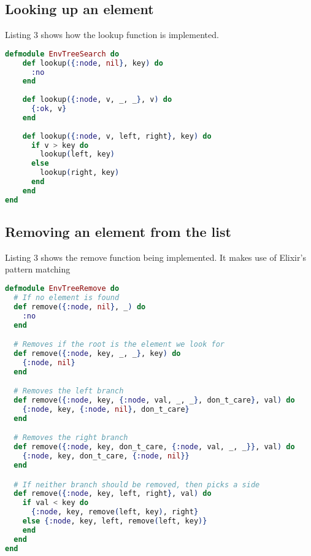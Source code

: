 \subsection{Looking up an element}
Listing 3 shows how the lookup function is implemented. 

\begin{lstlisting}[language=Elixir, caption=Lookup function EnvTree]
defmodule EnvTreeSearch do
    def lookup({:node, nil}, key) do
      :no
    end
  
    def lookup({:node, v, _, _}, v) do
      {:ok, v}
    end
  
    def lookup({:node, v, left, right}, key) do
      if v > key do
        lookup(left, key)
      else
        lookup(right, key)
      end
    end
end
\end{lstlisting}

\subsection{Removing an element from the list}
Listing 3 shows the remove function being implemented. It makes use of Elixir's pattern matching

\begin{lstlisting}[language=Elixir, caption=Remove function function EnvTree]
defmodule EnvTreeRemove do
  # If no element is found
  def remove({:node, nil}, _) do
    :no
  end

  # Removes if the root is the element we look for
  def remove({:node, key, _, _}, key) do
    {:node, nil}
  end

  # Removes the left branch
  def remove({:node, key, {:node, val, _, _}, don_t_care}, val) do
    {:node, key, {:node, nil}, don_t_care}
  end

  # Removes the right branch
  def remove({:node, key, don_t_care, {:node, val, _, _}}, val) do
    {:node, key, don_t_care, {:node, nil}}
  end

  # If neither branch should be removed, then picks a side
  def remove({:node, key, left, right}, val) do
    if val < key do
      {:node, key, remove(left, key), right}
    else {:node, key, left, remove(left, key)}
    end
  end
end
\end{lstlisting}
